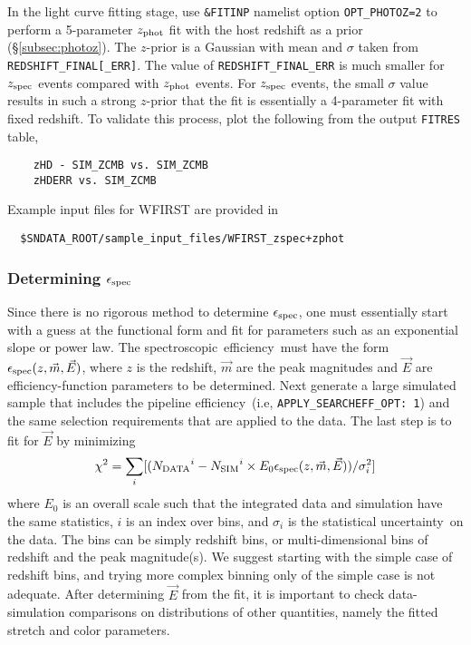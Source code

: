 \documentclass[12pt]{article}
\newcommand{\unc}{uncertainty}
\newcommand{\Zphot}{z_{\rm phot}}
\newcommand{\Zspec}{z_{\rm spec}}
\newcommand{\eff}{efficiency}
\newcommand{\simeffspec}{\epsilon_{\rm spec}}
\newcommand{\spec}{spectroscopic}
\begin{document}
{In the light curve fitting stage, use {\tt \&FITINP} namelist option  {\tt OPT\_PHOTOZ=2}
to perform a  5-parameter $\Zphot$ fit with the host redshift as a prior (\S\ref{subsec:photoz}).
The $z$-prior is a Gaussian with mean and $\sigma$ taken from {\tt REDSHIFT\_FINAL[\_ERR]}. 
The value of  {\tt REDSHIFT\_FINAL\_ERR} is much smaller for $\Zspec$
events compared with $\Zphot$ events. For $\Zspec$ events, the small $\sigma$ value
results in such a strong $z$-prior that the fit is essentially a 4-parameter fit with fixed redshift.
To validate this process, plot the following
from the output {\tt FITRES} table,
\begin{Verbatim}
    zHD - SIM_ZCMB vs. SIM_ZCMB
    zHDERR vs. SIM_ZCMB
\end{Verbatim}

\medskip
\noindent Example input files for WFIRST are provided in
\vspace{-0.2cm}
\begin{Verbatim}
  $SNDATA_ROOT/sample_input_files/WFIRST_zspec+zphot 
\end{Verbatim}

   \subsubsection{Determining $\simeffspec$}
   \label{sssec:simeffspec}

\newcommand{\Ndata}{N_{\rm DATA}}
\newcommand{\Nsim}{N_{\rm SIM}}

Since there is no rigorous method to determine $\simeffspec$,
one must essentially start with a guess at the functional 
form and fit for parameters such as an exponential slope or power law.
The \spec\ \eff\ must have the form
$\simeffspec(z,\vec{m},\vec{E})$, where 
$z$ is the redshift, $\vec{m}$ are the peak magnitudes and 
$\vec{E}$ are \eff-function parameters
to be determined. Next generate a large simulated
sample that includes the pipeline \eff\
(i.e, {\tt APPLY\_SEARCHEFF\_OPT: 1}) and the same
selection requirements that are applied to the data.
The last step is to fit for $\vec{E}$ by minimizing
\begin{equation}
   \chi^2 = \sum_i  
  [( {\Ndata}^i - 
   {\Nsim}^i \times E_0\simeffspec(z,\vec{m},\vec{E}) )/\sigma_i^2 ]
\end{equation}
% 
where $E_0$ is an overall scale such that
the integrated data and simulation have the same
statistics, $i$ is an index over bins,
and $\sigma_i$ is the statistical \unc\ on the data.
The bins can be simply redshift bins, 
or multi-dimensional bins of redshift and the peak magnitude(s).
We suggest starting with the simple case of redshift bins,
and trying more complex binning only of the simple case
is not adequate. After determining $\vec{E}$ from the fit,
it is important to check data-simulation comparisons
on distributions of other quantities, namely the
fitted stretch and color parameters.


}
\end{document}
